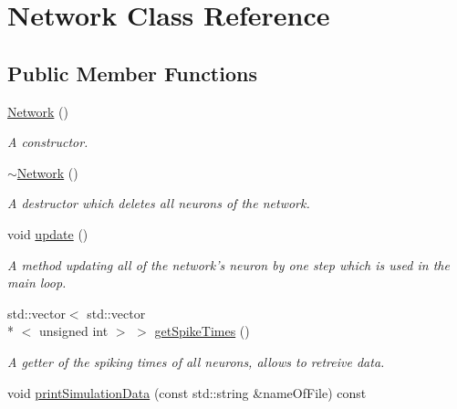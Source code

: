 \hypertarget{classNetwork}{\section{Network Class Reference}
\label{classNetwork}
}
\subsection*{Public Member Functions}
\begin{DoxyCompactItemize}
\item 
\hyperlink{classNetwork_a3cc2fb4f8fa4d507077e8da85ce5a1c8}{Network} ()
\begin{DoxyCompactList}\small\item\em A constructor. \end{DoxyCompactList}\item 
\hypertarget{classNetwork_a7a4e19cdb4bf0c7ecf82baa643831492}{\hyperlink{classNetwork_a7a4e19cdb4bf0c7ecf82baa643831492}{$\sim$\-Network} ()}\label{classNetwork_a7a4e19cdb4bf0c7ecf82baa643831492}

\begin{DoxyCompactList}\small\item\em A destructor which deletes all neurons of the network. \end{DoxyCompactList}\item 
\hypertarget{classNetwork_ab07bb6f6d9020b9eb230551083ea929f}{void \hyperlink{classNetwork_ab07bb6f6d9020b9eb230551083ea929f}{update} ()}\label{classNetwork_ab07bb6f6d9020b9eb230551083ea929f}

\begin{DoxyCompactList}\small\item\em A method updating all of the network's neuron by one step which is used in the main loop. \end{DoxyCompactList}\item 
\hypertarget{classNetwork_a618d267c0962f59027c0d063aa2b4533}{std\-::vector$<$ std\-::vector\\*
$<$ unsigned int $>$ $>$ \hyperlink{classNetwork_a618d267c0962f59027c0d063aa2b4533}{get\-Spike\-Times} ()}\label{classNetwork_a618d267c0962f59027c0d063aa2b4533}

\begin{DoxyCompactList}\small\item\em A getter of the spiking times of all neurons, allows to retreive data. \end{DoxyCompactList}\item 
void \hyperlink{classNetwork_a222e084554183af355833cda07a83877}{print\-Simulation\-Data} (const std\-::string \&name\-Of\-File) const 
\end{DoxyCompactItemize}


